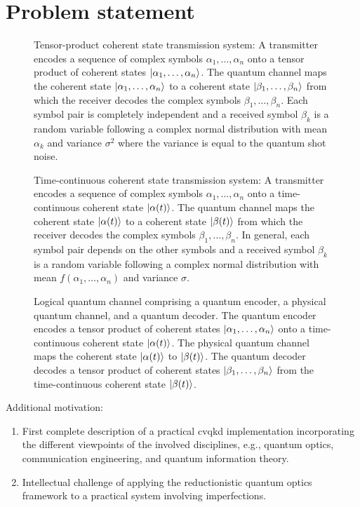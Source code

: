 \section{Problem statement}

\begin{figure}[htb]
	\centering
	
	\caption{Tensor-product coherent state transmission system: A transmitter encodes a sequence of complex symbols $\alpha_1,\dots,\alpha_n$ onto a tensor product of coherent states $\ket{\alpha_1,\dots,\alpha_n}$. The quantum channel maps the coherent state $\ket{\alpha_1,\dots,\alpha_n}$ to a coherent state $\ket{\beta_1,\dots,\beta_n}$ from which the receiver decodes the complex symbols $\beta_1,\dots,\beta_n$. Each symbol pair is completely independent and a received symbol $\beta_k$ is a random variable following a complex normal distribution with mean $\alpha_k$ and variance $\sigma^2$ where the variance is equal to the quantum shot noise.}
\end{figure}
\begin{figure}[htb]
	\centering
	
	\caption{Time-continuous coherent state transmission system: A transmitter encodes a sequence of complex symbols $\alpha_1,\dots,\alpha_n$ onto a time-continuous coherent state $\ket{\alpha(t)}$. The quantum channel maps the coherent state $\ket{\alpha(t)}$ to a coherent state $\ket{\beta(t)}$ from which the receiver decodes the complex symbols $\beta_1,\dots,\beta_n$. In general, each symbol pair depends on the other symbols and a received symbol $\beta_k$ is a random variable following a complex normal distribution with mean $f(\alpha_1,\dots,\alpha_n)$ and variance $\sigma$.}
\end{figure}
\begin{figure}[htb]
	\centering
	
	\caption{Logical quantum channel comprising a quantum encoder, a physical quantum channel, and a quantum decoder. The quantum encoder encodes a tensor product of coherent states $\ket{\alpha_1,\dots,\alpha_n}$ onto a time-continuous coherent state $\ket{\alpha(t)}$. The physical quantum channel maps the coherent state $\ket{\alpha(t)}$ to $\ket{\beta(t)}$. The quantum decoder decodes a tensor product of coherent states $\ket{\beta_1,\dots,\beta_n}$ from the time-continuous coherent state $\ket{\beta(t)}$.}
\end{figure}

Additional motivation:
\begin{enumerate}
	\item First complete description of a practical \gls{cvqkd} implementation incorporating the different viewpoints of the involved disciplines, e.g., quantum optics, communication engineering, and quantum information theory.
	\item Intellectual challenge of applying the reductionistic quantum optics framework to a practical system involving imperfections.
\end{enumerate}